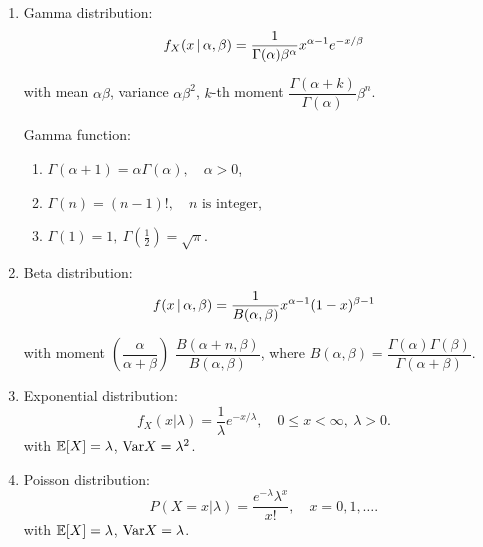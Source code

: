 \begin{enumerate}[
        leftmargin = 2em,
    ]
    \item Gamma distribution: $$
        f_X(x \, | \, \alpha, \beta) = \frac{1}{\Gamma(\alpha)\beta^\alpha} x^{\alpha - 1} e^{-x/\beta}
    $$ 
    
    \vspace{-1ex} with mean $\alpha\beta$, variance $\alpha\beta^2$, $k$-th moment $\dfrac{\Gamma(\alpha+k)}{\Gamma(\alpha)}\beta^n$.
    
    Gamma function: \begin{enumerate}
        \item $\Gamma(\alpha + 1) = \alpha \Gamma(\alpha), \quad \alpha > 0$,
        \item $\Gamma(n) = (n-1)!, \quad n\text{ is integer}$, 
        \item $\Gamma(1) = 1,\ \Gamma(\frac{1}{2}) = \sqrt{\pi}$.
    \end{enumerate}
    \item Beta distribution: $$
        f(x \, | \, \alpha, \beta)=\frac{1}{B(\alpha, \beta)}x^{\alpha-1}(1-x)^{\beta-1}
    $$ 
    
    \vspace{-1ex} with moment  $(\dfrac{\alpha}{\alpha + \beta})$ $\dfrac{B(\alpha+n, \beta)}{B(\alpha, \beta)}$, where $B(\alpha, \beta)=\dfrac{\Gamma(\alpha)\Gamma(\beta)}{\Gamma(\alpha+\beta)}$.
    
    \item Exponential distribution: 
        \[ f_X(x \vert \lambda)=\frac{1}{\lambda}e^{-x/\lambda}, \quad 0\leq x < \infty,\ \lambda > 0. \]
        with $\mathbb{E}[X] = \lambda$, $\text{Var}{X} = \lambda^2$.
    
    \item Poisson distribution: 
        \[ P(X=x \vert \lambda)=\frac{e^{-\lambda}\lambda^x}{x!}, \quad x = 0, 1, \dots. \]
        with $\mathbb{E}[X] = \lambda$, $\text{Var}{X} = \lambda$.
\end{enumerate}













